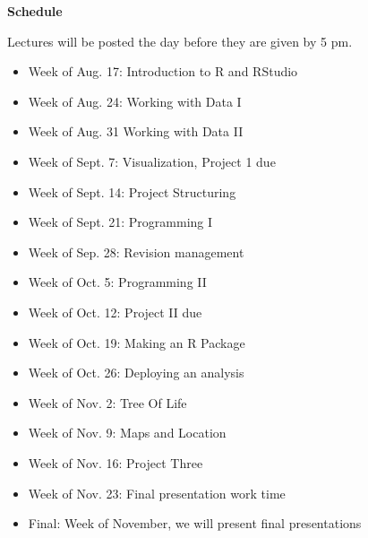 \documentclass[12pt]{article}
\let\oldtextbf\textbf
\renewcommand{\textbf}[1]{\textcolor{coolblack}{\oldtextbf{#1}}}
\begin{document}
\begin{flushleft}
\textbf{Schedule}
\end{flushleft}

Lectures will be posted the day before they are given by 5 pm.

\begin{itemize}
\item Week of Aug. 17: Introduction to R and RStudio
\item Week of Aug. 24:  Working with Data I
\item Week of Aug. 31 Working with Data II
\item Week of Sept. 7: Visualization, Project 1 due
\item Week of Sept. 14: Project Structuring 
\item Week of Sept. 21: Programming I
\item Week of Sep. 28:  Revision management
\item Week of Oct. 5: Programming II
\item Week of Oct. 12: Project II due
\item Week of Oct. 19: Making an R Package
\item Week of Oct. 26:  Deploying an analysis
\item Week of Nov. 2: Tree Of Life

\item Week of Nov. 9:  Maps and Location
\item Week of Nov. 16: Project Three
\item Week of Nov. 23: Final presentation work time
\item Final: 
    Week of November, we will present final presentations 


\end{itemize}
\end{document}
